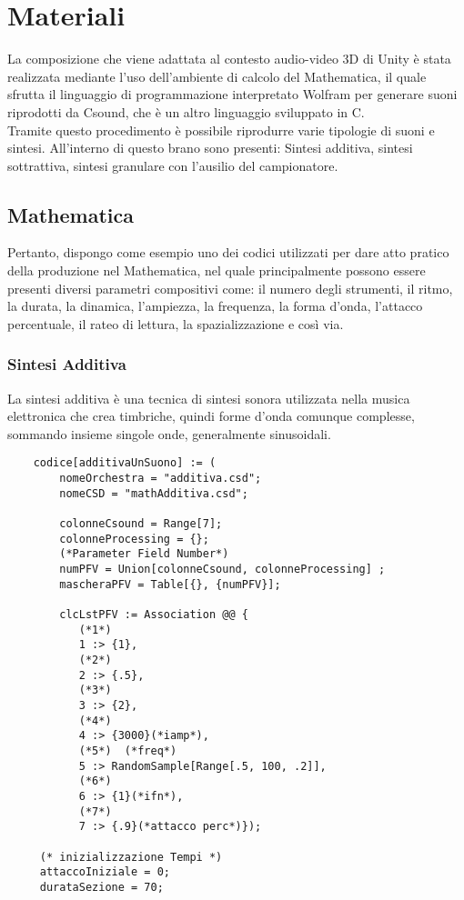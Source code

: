 \section{Materiali}
La composizione che viene adattata al contesto audio-video 3D di Unity è stata realizzata mediante 
l'uso dell'ambiente di calcolo del Mathematica,
il quale sfrutta il linguaggio di programmazione interpretato Wolfram per generare suoni riprodotti da Csound,
che è un altro linguaggio sviluppato in C.\\
Tramite questo procedimento è possibile riprodurre varie tipologie di suoni e sintesi.
All'interno di questo brano sono presenti: Sintesi additiva, sintesi sottrattiva, sintesi granulare con l'ausilio del campionatore.\\

\subsection*{Mathematica}

Pertanto, dispongo come esempio uno dei codici utilizzati per dare atto pratico della produzione nel Mathematica, nel quale principalmente
possono essere presenti diversi parametri compositivi come: il numero degli strumenti, il ritmo, la durata, la dinamica, l'ampiezza, la frequenza, la forma d'onda,
l'attacco percentuale, il rateo di lettura, la spazializzazione e così via.

\subsubsection*{Sintesi Additiva}

La sintesi additiva è una tecnica di sintesi sonora utilizzata nella musica elettronica che crea timbriche,
 quindi forme d'onda comunque complesse, sommando insieme singole onde, generalmente sinusoidali.

\begin{lstlisting}
    codice[additivaUnSuono] := (
        nomeOrchestra = "additiva.csd";
        nomeCSD = "mathAdditiva.csd";
        
        colonneCsound = Range[7];
        colonneProcessing = {};
        (*Parameter Field Number*)
        numPFV = Union[colonneCsound, colonneProcessing] ;
        mascheraPFV = Table[{}, {numPFV}];
        
        clcLstPFV := Association @@ {
           (*1*)
           1 :> {1},
           (*2*)
           2 :> {.5},
           (*3*)
           3 :> {2},
           (*4*)
           4 :> {3000}(*iamp*),
           (*5*)  (*freq*)
           5 :> RandomSample[Range[.5, 100, .2]],
           (*6*)
           6 :> {1}(*ifn*),
           (*7*)
           7 :> {.9}(*attacco perc*)});
     
     (* inizializzazione Tempi *)
     attaccoIniziale = 0;
     durataSezione = 70;
    \end{lstlisting}

